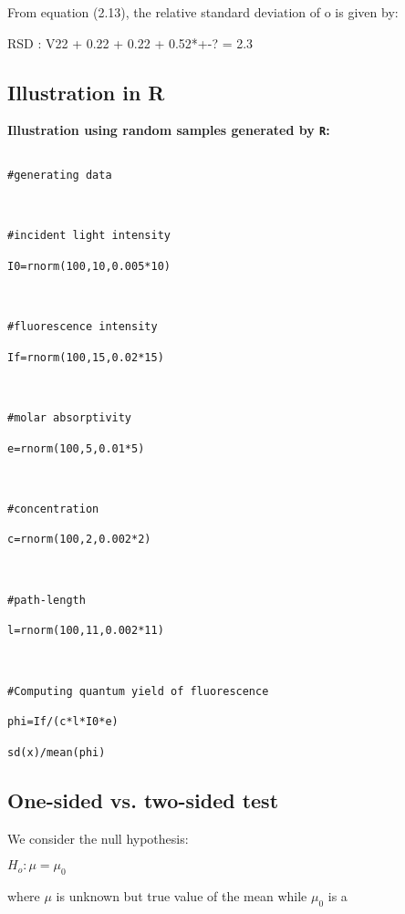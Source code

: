 From equation (2.13), the relative standard deviation of o is given by:

RSD : V22 + 0.22 + 0.22 + 0.52*+-? = 2.3%

 

\subsection{Illustration in R}

 

\textbf{Illustration using random samples generated by \texttt{R}:}

 

\begin{verbatim}

#generating data

 

#incident light intensity

I0=rnorm(100,10,0.005*10)

 

#fluorescence intensity

If=rnorm(100,15,0.02*15)

 

#molar absorptivity

e=rnorm(100,5,0.01*5)

 

#concentration

c=rnorm(100,2,0.002*2)

 

#path-length

l=rnorm(100,11,0.002*11)

 

#Computing quantum yield of fluorescence

phi=If/(c*l*I0*e)

sd(x)/mean(phi)

\end{verbatim}

 


\subsection{One-sided vs. two-sided test}


We consider the null hypothesis:

$H_o : \mu = \mu_0$

where $\mu$ is unknown but true value of the mean while $\mu_0$ is a

